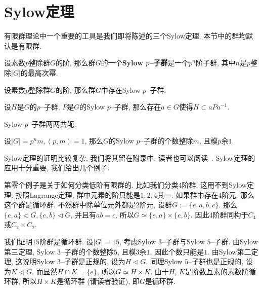 \section{Sylow定理}

有限群理论中一个重要的工具是我们即将陈述的三个Sylow定理.
本节中的群均默认是有限群.
\begin{defn}
    设素数$p$整除群$G$的阶, 那么群$G$的一个\textbf{Sylow $p$--子群}是一个$p^n$阶子群, 其中$n$是$p$整除$|G|$的最高次幂.
\end{defn}

\begin{thm}[Sylow第一定理]
    设素数$p$整除群$G$的阶, 那么群$G$中存在Sylow $p$--子群.
\end{thm}

\begin{thm}[Sylow第二定理]
    设$H$是$G$的$p$--子群, $P$是$G$的Sylow $p$--子群, 那么存在$a\in G$使得$H\subset aPa^{-1}$.
\end{thm}

\begin{col}
    Sylow $p$--子群两两共轭.
\end{col}

\begin{thm}[Sylow第三定理]
    设$|G|=p^nm,(p,m)=1$, 那么$G$的Sylow $p$--子群的个数整除$m$, 且模$p$余$1$.
\end{thm}

Sylow定理的证明比较复杂, 我们将其留在附录中.
读者也可以阅读~\parencite[pp.\ 33--36]{Lang}.
Sylow定理的应用十分重要, 我们给出几个例子.

\begin{eg}
    第零个例子是关于如何分类低阶有限群的.
    比如我们分类$4$阶群, 这用不到Sylow定理:
    按照Lagrange定理, 群中元素的阶只能是$1,2,4$其一.
    如果群中存在$4$阶元, 那么这个群是循环群.
    不然群中除单位元外都是$2$阶元, 设群$G:=\{e,a,b,c\}$.
    那么$\{e,a\}\lhd G,\{e,b\}\lhd G$, 并且有$ab=c$, 所以$G\simeq\{e,a\}\times\{e,b\}$.
    因此$4$阶群同构于$C_4$或$C_2\times C_2$.
\end{eg}

\begin{eg}
    我们证明$15$阶群是循环群.
    设$|G|=15$, 考虑Sylow $3$--子群与Sylow $5$--子群.
    由Sylow第三定理, Sylow $3$--子群的个数整除$5$, 且模$3$余$1$, 因此个数只能是$1$.
    由Sylow第二定理, 这说明Sylow $3$--子群是正规的, 设为$H\lhd G$.
    同理Sylow $5$--子群也是正规的, 设为$K\lhd G$.
    而显然$H\cap K=\{e\}$, 所以$G\simeq H\times K$.
    由于$H$, $K$是阶数互素的素数阶循环群, 所以$H\times K$是循环群 (请读者验证), 即$G$是循环群.
\end{eg}

